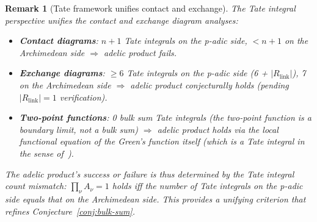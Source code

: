\documentclass[11pt,a4paper]{article}
\newtheorem{remark}{Remark}
\begin{document}
\begin{remark}[Tate framework unifies contact and exchange]
\label{rem:tate-unify}
The Tate integral perspective unifies the contact and exchange diagram analyses:
\begin{itemize}[leftmargin=2em]
    \item \textbf{Contact diagrams}: $n{+}1$ Tate integrals on the p-adic side, $< n{+}1$ on the Archimedean side $\Rightarrow$ adelic product fails.
    \item \textbf{Exchange diagrams}: $\geq 6$ Tate integrals on the p-adic side (6 + $|R_{\mathrm{link}}|$), 7 on the Archimedean side $\Rightarrow$ adelic product conjecturally holds (pending $|R_{\mathrm{link}}| = 1$ verification).
    \item \textbf{Two-point functions}: 0 bulk sum Tate integrals (the two-point function is a boundary limit, not a bulk sum) $\Rightarrow$ adelic product holds via the local functional equation of the Green's function itself (which is a Tate integral in the sense of~\cite{HSYZ20}).
\end{itemize}
The adelic product's success or failure is thus determined by the \emph{Tate integral count mismatch}: $\prod_\nu A_\nu = 1$ holds iff the number of Tate integrals on the p-adic side equals that on the Archimedean side. This provides a unifying criterion that refines Conjecture~\ref{conj:bulk-sum}.
\end{remark}
\end{document}
